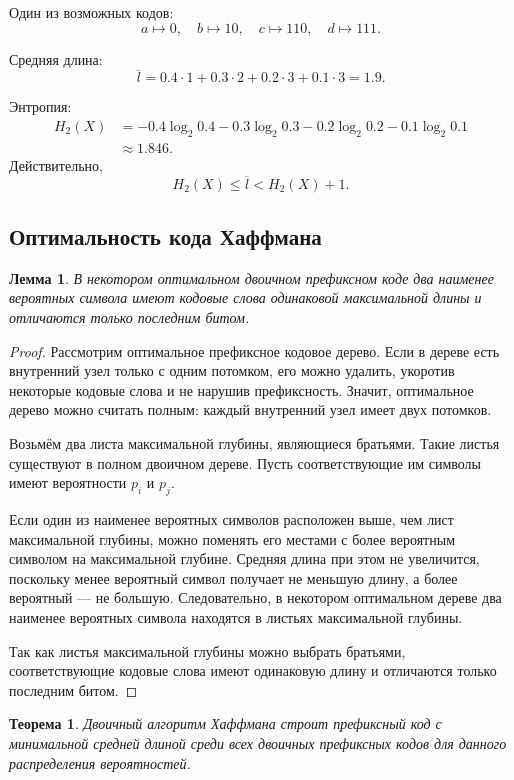 \documentclass[12pt,a4paper]{article}
\newtheorem{theorem}{Теорема}[section]
\newtheorem{lemma}{Лемма}[section]
\begin{document}
Один из возможных кодов:
\[
    a\mapsto 0,\quad
    b\mapsto 10,\quad
    c\mapsto 110,\quad
    d\mapsto 111.
\]

Средняя длина:
\[
    \overline l
    =
    0.4\cdot 1+0.3\cdot 2+0.2\cdot 3+0.1\cdot 3
    =
    1.9.
\]

Энтропия:
\[
\begin{aligned}
H_2(X)
&=
-0.4\log_2 0.4
-0.3\log_2 0.3
-0.2\log_2 0.2
-0.1\log_2 0.1\\
&\approx 1.846.
\end{aligned}
\]
Действительно,
\[
    H_2(X)\le \overline l < H_2(X)+1.
\]

\subsection{Оптимальность кода Хаффмана}

\begin{lemma}
В некотором оптимальном двоичном префиксном коде два наименее вероятных символа имеют кодовые слова одинаковой максимальной длины и отличаются только последним битом.
\end{lemma}

\begin{proof}
Рассмотрим оптимальное префиксное кодовое дерево.
Если в дереве есть внутренний узел только с одним потомком, его можно удалить, укоротив некоторые кодовые слова и не нарушив префиксность.
Значит, оптимальное дерево можно считать полным: каждый внутренний узел имеет двух потомков.

Возьмём два листа максимальной глубины, являющиеся братьями.
Такие листья существуют в полном двоичном дереве.
Пусть соответствующие им символы имеют вероятности $p_i$ и $p_j$.

Если один из наименее вероятных символов расположен выше, чем лист максимальной глубины, можно поменять его местами с более вероятным символом на максимальной глубине.
Средняя длина при этом не увеличится, поскольку менее вероятный символ получает не меньшую длину, а более вероятный --- не большую.
Следовательно, в некотором оптимальном дереве два наименее вероятных символа находятся в листьях максимальной глубины.

Так как листья максимальной глубины можно выбрать братьями, соответствующие кодовые слова имеют одинаковую длину и отличаются только последним битом.
\end{proof}

\begin{theorem}
Двоичный алгоритм Хаффмана строит префиксный код с минимальной средней длиной среди всех двоичных префиксных кодов для данного распределения вероятностей.
\end{theorem}
\end{document}
